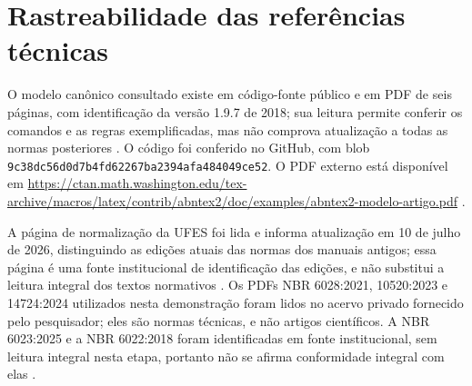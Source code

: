 \section*{\centering Rastreabilidade das referências técnicas}
O modelo canônico consultado existe em código-fonte público e em PDF de seis páginas, com identificação da versão 1.9.7 de 2018; sua leitura permite conferir os comandos e as regras exemplificadas, mas não comprova atualização a todas as normas posteriores \citep{abntex2018}. O código foi conferido no GitHub, com blob \nolinkurl{9c38dc56d0d7b4fd62267ba2394afa484049ce52}. O PDF externo está disponível em \url{https://ctan.math.washington.edu/tex-archive/macros/latex/contrib/abntex2/doc/examples/abntex2-modelo-artigo.pdf} \citep{abntex2018}.

A página de normalização da UFES foi lida e informa atualização em 10 de julho de 2026, distinguindo as edições atuais das normas dos manuais antigos; essa página é uma fonte institucional de identificação das edições, e não substitui a leitura integral dos textos normativos \citep{ufes2026}. Os PDFs NBR 6028:2021, 10520:2023 e 14724:2024 utilizados nesta demonstração foram lidos no acervo privado fornecido pelo pesquisador; eles são normas técnicas, e não artigos científicos. A NBR 6023:2025 e a NBR 6022:2018 foram identificadas em fonte institucional, sem leitura integral nesta etapa, portanto não se afirma conformidade integral com elas \citep{ufes2026}.
